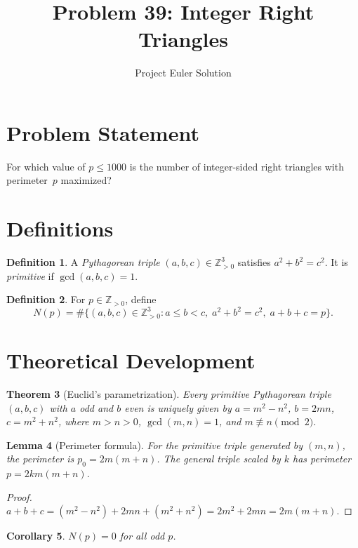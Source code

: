 \documentclass[12pt]{article}
\title{Problem 39: Integer Right Triangles}
\author{Project Euler Solution}
\date{}
\newtheorem{theorem}{Theorem}
\newtheorem{lemma}[theorem]{Lemma}
\newtheorem{corollary}[theorem]{Corollary}
\theoremstyle{definition}
\newtheorem{definition}[theorem]{Definition}
\begin{document}
\maketitle

\section{Problem Statement}
For which value of $p \le 1000$ is the number of integer-sided right triangles with perimeter~$p$ maximized?

\section{Definitions}

\begin{definition}
A \emph{Pythagorean triple} $(a,b,c) \in \mathbb{Z}_{>0}^3$ satisfies $a^2 + b^2 = c^2$. It is \emph{primitive} if $\gcd(a,b,c) = 1$.
\end{definition}

\begin{definition}
For $p \in \mathbb{Z}_{>0}$, define
\[
    N(p) = \#\{(a,b,c) \in \mathbb{Z}_{>0}^3 : a \le b < c,\; a^2 + b^2 = c^2,\; a+b+c = p\}.
\]
\end{definition}

\section{Theoretical Development}

\begin{theorem}[Euclid's parametrization]
Every primitive Pythagorean triple $(a,b,c)$ with $a$ odd and $b$ even is uniquely given by $a = m^2 - n^2$, $b = 2mn$, $c = m^2 + n^2$, where $m > n > 0$, $\gcd(m,n) = 1$, and $m \not\equiv n \pmod{2}$.
\end{theorem}

\begin{lemma}[Perimeter formula]
\label{lem:perim}
For the primitive triple generated by $(m,n)$, the perimeter is $p_0 = 2m(m+n)$. The general triple scaled by $k$ has perimeter $p = 2km(m+n)$.
\end{lemma}
\begin{proof}
$a + b + c = (m^2 - n^2) + 2mn + (m^2 + n^2) = 2m^2 + 2mn = 2m(m+n)$.
\end{proof}

\begin{corollary}
$N(p) = 0$ for all odd $p$.
\end{corollary}
\end{document}
